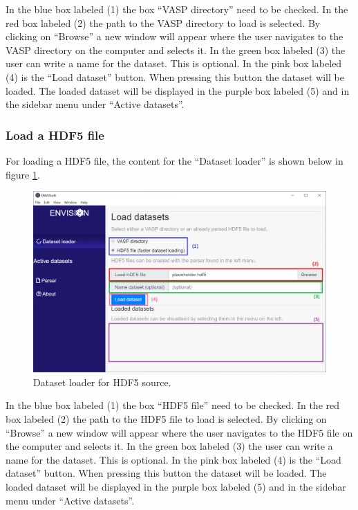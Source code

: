 In the blue box labeled (1) the box ``VASP directory'' need to be checked. In the red box labeled (2) the path to the VASP directory to load is selected. By clicking on ``Browse'' a new window will appear where the user navigates to the VASP directory on the computer and selects it. In the green box labeled (3) the user can write a name for the dataset. This is optional. In the pink box labeled (4) is the ``Load dataset'' button. When pressing this button the dataset will be loaded. The loaded dataset will be displayed in the purple box labeled (5) and in the sidebar menu under ``Active datasets''.

\subsubsection{Load a HDF5 file}
For loading a HDF5 file, the content for the ``Dataset loader'' is shown below in figure \ref{fig:GUIDatasetloaderHDF5}.

\begin{figure}[H]
    \centering
    \includegraphics[scale = 0.45]{Images/GUI.Datasetloader_HDF5.png}
    \caption{Dataset loader for HDF5 source.}
    \label{fig:GUIDatasetloaderHDF5}
\end{figure}

In the blue box labeled (1) the box ``HDF5 file'' need to be checked. In the red box labeled (2) the path to the HDF5 file to load is selected. By clicking on ``Browse'' a new window will appear where the user navigates to the HDF5 file on the computer and selects it. In the green box labeled (3) the user can write a name for the dataset. This is optional. In the pink box labeled (4) is the ``Load dataset'' button. When pressing this button the dataset will be loaded. The loaded dataset will be displayed in the purple box labeled (5) and in the sidebar menu under ``Active datasets''.

